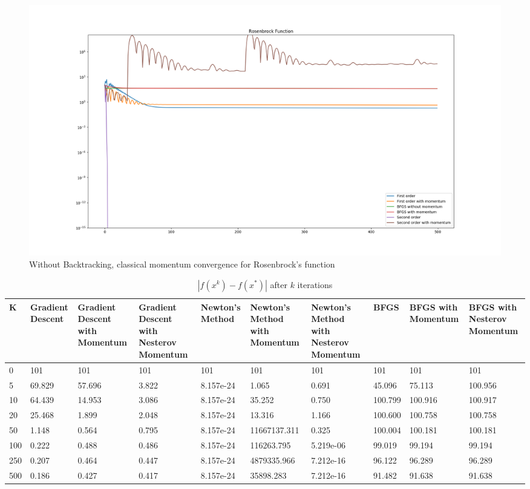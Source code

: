 \documentclass{article}
\begin{document}
\begin{center}
\begin{figure}[H]
	\includegraphics[width=\linewidth]{../Images/rosenbrockmomentum1.png}
	\caption{Without Backtracking, classical momentum convergence for Rosenbrock's function}
	\label{fig:Without Backtracking, classical momentum convergence for Rosenbrock's function}
\end{figure}

\begin{table}[H]
	\centering
	\caption{$ | f(x^k) - f(x^*) | $ after $k$ iterations}
	\label{Rosenbrock's function table}
	\begin{tabular}{|l|p{1.2cm}|p{1.2cm}|p{1.2cm}|p{1.2cm}|p{1.2cm}|p{1.2cm}|p{1.2cm}|p{1.2cm}|p{1.2cm}|}
		\hline
		K & Gradient Descent & Gradient Descent with Momentum & Gradient Descent with Nesterov Momentum & Newton's Method & Newton's Method with Momentum & Newton's Method with Nesterov Momentum & BFGS & BFGS with Momentum & BFGS with Nesterov Momentum \\
		\hline
		0 & 101 & 101 & 101 & 101 & 101 & 101 & 101 & 101 & 101 \\
		\hline
		5 & 69.829 & 57.696 & 3.822 & 8.157e-24 & 1.065 & 0.691 & 45.096 & 75.113 & 100.956 \\
		\hline
		10 & 64.439 & 14.953 & 3.086 & 8.157e-24 & 35.252 & 0.750 & 100.799 & 100.916 & 100.917 \\
		\hline
		20 & 25.468 & 1.899 & 2.048 & 8.157e-24 & 13.316 & 1.166 & 100.600 & 100.758 & 100.758 \\
		\hline
		50 & 1.148 & 0.564 & 0.795 & 8.157e-24 & 11667137.311 & 0.325 & 100.004 & 100.181 & 100.181 \\
		\hline
		100 & 0.222 & 0.488 & 0.486 & 8.157e-24 & 116263.795 & 5.219e-06 & 99.019 & 99.194 & 99.194 \\
		\hline
		250 & 0.207 & 0.464 & 0.447 & 8.157e-24 & 4879335.966 & 7.212e-16 & 96.122 & 96.289 & 96.289 \\
		\hline
		500 & 0.186 & 0.427 & 0.417 & 8.157e-24 & 35898.283 & 7.212e-16 & 91.482 & 91.638 & 91.638 \\
		\hline
	\end{tabular}
\end{table}


\end{center}
\end{document}
